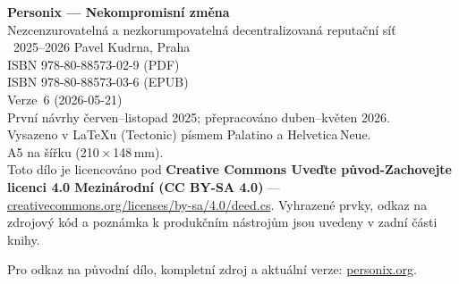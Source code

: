 \thispagestyle{empty}
\ifdefined\printmode\vspace*{\fill}\else{}\fi
\begin{flushleft}\small\sffamily
\textbf{Personix --- Nekompromisní změna}\\[0.3em]
Nezcenzurovatelná a nezkorumpovatelná decentralizovaná reputační síť\\[1.4em]

\textcopyright\ 2025--2026 Pavel Kudrna, Praha\\[0.4em]

ISBN 978-80-88573-02-9 (PDF)\\
ISBN 978-80-88573-03-6 (EPUB)\\[0.4em]

Verze~6 (2026-05-21)\\
První návrhy červen--listopad 2025; přepracováno duben--květen 2026.\\[1.4em]

Vysazeno v \LaTeX{}u (Tectonic) písmem Palatino a Helvetica\,Neue.\\
A5 na šířku (210\,$\times$\,148\,mm).\\[1.4em]

Toto dílo je licencováno pod \textbf{Creative Commons Uveďte původ-Zachovejte
licenci 4.0 Mezinárodní (CC BY-SA 4.0)} ---
\href{https://creativecommons.org/licenses/by-sa/4.0/deed.cs}{creativecommons.org/licenses/by-sa/4.0/deed.cs}.
Vyhrazené prvky, odkaz na zdrojový kód a poznámka k produkčním nástrojům
jsou uvedeny v zadní části knihy.

Pro odkaz na původní dílo, kompletní zdroj a aktuální verze:
\href{https://personix.org}{personix.org}.
\end{flushleft}
\ifdefined\printmode\else{}\fi
\clearpage
